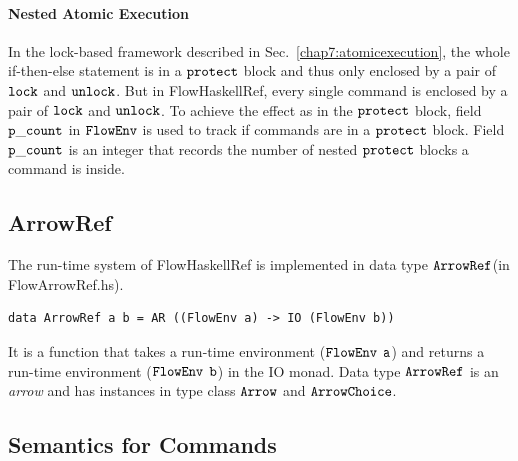 \documentclass{report}
\newcommand{\co}[1]{$\cod{#1}$}
\begin{document}
\paragraph{Nested Atomic Execution}
In the lock-based framework described in Sec.~\ref{chap7:atomicexecution}, the whole if-then-else statement
is in a \co{protect} block and thus only enclosed by a pair of \co{lock} and \co{unlock}. 
But in FlowHaskellRef, every single command is enclosed by a pair of \co{lock} 
and \co{unlock}. To achieve the effect as in the \co{protect} block, field \co{p\_count} in \co{FlowEnv}
is used to track if commands are in a \co{protect} block. Field \co{p\_count} is an integer that records
the number of nested \co{protect} blocks a command is inside.

\subsection{ArrowRef}
The run-time system of FlowHaskellRef is implemented in data type \co{ArrowRef}(in FlowArrowRef.hs). 
\begin{Verbatim}[fontsize=\small]
data ArrowRef a b = AR ((FlowEnv a) -> IO (FlowEnv b))
\end{Verbatim}
It is a function that takes a run-time environment (\co{FlowEnv} \co{a}) and returns a run-time environment
(\co{FlowEnv} \co{b}) in the IO monad. Data type \co{ArrowRef} is an {\em arrow} and has instances in
type class \co{Arrow} and \co{ArrowChoice}.

\subsection{Semantics for Commands}
\end{document}
